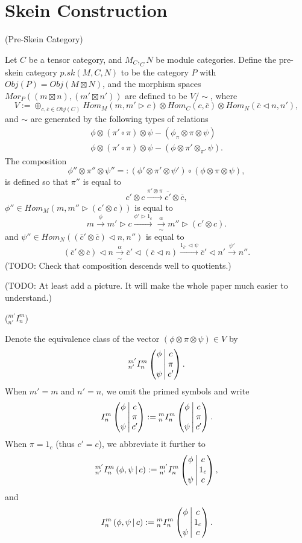\section{Skein Construction}\label{section/skein-construction}

\begin{definition} (Pre-Skein Category)

  \noindent Let $C$ be a tensor category, and $M_{C}, _{C}N$ be module
  categories. Define the pre-skein category $p.sk(M,C,N)$ to be the category
  $P$ with $Obj(P) = Obj(M \boxtimes N)$, and the morphism spaces
  $Mor_{P}((m \boxtimes n), (m' \boxtimes n'))$ are defined to be $V / \sim$,
  where
  \[
    V := \oplus_{c,\overline{c} \in Obj(C)} Hom_{M}(m, m' \rhd c) \otimes Hom_{C}(c,\overline{c}) \otimes Hom_{N} (\overline{c} \lhd n, n'),
  \]
  and $\sim$ are generated by the following types of relations
  \begin{align}
    \phi \otimes (\pi' \circ \pi) \otimes \psi - (\phi_{\pi} \otimes \pi \otimes \psi)\\
    \phi \otimes (\pi' \circ \pi) \otimes \psi - (\phi \otimes \pi' \otimes _{\pi'}\psi).
  \end{align}
  The composition
  \[
    \phi'' \otimes \pi'' \otimes \psi'' =:
    (\phi' \otimes \pi' \otimes \psi' ) \circ (
    \phi \otimes \pi \otimes \psi ),
  \]
  is defined so that $\pi''$ is equal to
  \[
    c' \otimes c \xrightarrow{\pi' \otimes \pi} \overline{c'} \otimes \overline{c},
  \]
  \noindent $\phi'' \in Hom_{M}(m, m'' \rhd (c' \otimes c))$ is equal to
  \[
    m \xrightarrow{\phi} m' \rhd c \xrightarrow{\phi' \rhd 1_{c}} \xrightarrow[\sim]{\alpha} m'' \rhd (c' \otimes c).
  \]
  \noindent and $\psi'' \in Hom_{N}((\overline{c}' \otimes \overline{c}) \lhd n, n'')$ is equal to
  \[
    (\overline{c}' \otimes \overline{c}) \lhd n \xrightarrow[\sim]{\alpha} \overline{c}' \lhd (\overline{c} \lhd n) \xrightarrow{1_{\overline{c}'} \lhd \psi} \overline{c}' \lhd n' \xrightarrow{\psi'} n''.
  \]
  (TODO: Check that composition descends well to quotients.)

\end{definition}

(TODO: At least add a picture. It will make the whole paper much easier to understand.)
\begin{notation} (${}^{m'}_{n'}I^{m}_{n}$)

  \noindent Denote the equivalence class of the vector
  $(\phi \otimes \pi \otimes \psi) \in V$ by
  \[{}^{m'}_{n'} I^{m}_{n} \left( \begin{matrix} \phi \\ {}\\ \psi \end{matrix} \,\middle|\, \begin{matrix} c \\ \pi \\ c' \end{matrix} \right).\]
  When $m' = m$ and $n' = n$, we omit the primed symbols and write
  \[
    {}^{}_{} I^{m}_{n} \left( \begin{matrix} \phi \\ {}\\ \psi \end{matrix} \,\middle|\, \begin{matrix} c \\ \pi \\ c' \end{matrix} \right) :=
    {}^{m}_{n} I^{m}_{n} \left( \begin{matrix} \phi \\ {}\\ \psi \end{matrix} \,\middle|\, \begin{matrix} c \\ \pi \\ c' \end{matrix} \right).
  \]
  When $\pi = 1_{c}$ (thus $c' = c$), we abbreviate it further to
  \[
    {}^{m'}_{n'} I^{m}_{n} \left( \phi, \psi \,\middle|\, c \right) :=
    {}^{m'}_{n'} I^{m}_{n} \left( \begin{matrix} \phi \\ {}\\ \psi \end{matrix} \,\middle|\, \begin{matrix} c \\ 1_{c} \\ c \end{matrix} \right),
  \]
  and
  \[
    {}^{}_{} I^{m}_{n} \left( \phi, \psi \,\middle|\, c \right) :=
    {}^{m}_{n} I^{m}_{n} \left( \begin{matrix} \phi \\ {}\\ \psi \end{matrix} \,\middle|\, \begin{matrix} c \\ 1_{c} \\ c \end{matrix} \right).
  \]
\end{notation}

